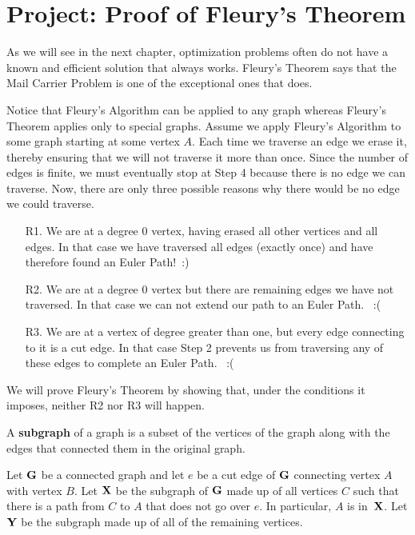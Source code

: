 \section{Project:  Proof of Fleury's Theorem}

As we will see in the next chapter, optimization problems often do not have a known and efficient solution that always works.  Fleury's Theorem says that the Mail Carrier Problem is one of the exceptional ones that does.

Notice that Fleury's Algorithm can be applied to any graph whereas Fleury's Theorem applies only to special graphs.  Assume we apply Fleury's Algorithm to some graph starting at some vertex $A$.  Each time we traverse an edge we erase it, thereby ensuring that we will not traverse it more than once.  Since the number of edges is finite, we must eventually stop at Step 4 because there is no edge we can traverse.  Now, there are only three possible reasons why there would be no edge we could traverse.
\begin{enumerate}
   \item[R1.] We are at a degree 0 vertex, having erased all other vertices and all edges.  In that case we have traversed all edges (exactly once) and have therefore found an Euler Path!\ \hfill  :)
   \item[R2.] We are at a degree 0 vertex but there are remaining edges we have not traversed.  In that case we can not extend our path to an Euler Path. \ \hfill :(
   \item[R3.]  We are at a vertex of degree greater than one, but every edge connecting to it is a cut edge.  In that case Step 2 prevents us from traversing any of these edges to complete an Euler Path. \ \hfill :(
\end{enumerate}

We will prove Fleury's Theorem by showing that, under the conditions it imposes, neither R2 nor R3 will happen.

\begin{dfn}
A \textbf{subgraph} of a graph is a subset of the vertices of the graph along with the edges that connected them in the original graph.
\end{dfn}

Let $\mathbf G$ be a connected graph and let $e$ be a cut edge of $\mathbf G$ connecting vertex $A$ with vertex $B$.  Let $\mathbf X$ be the subgraph of $\mathbf G$ made up of all vertices $C$ such that there is a path from $C$ to $A$ that does not go over $e$.  In particular, $A$ is in~$\mathbf X$.  Let $\mathbf Y$ be the subgraph made up of all of the remaining vertices.

